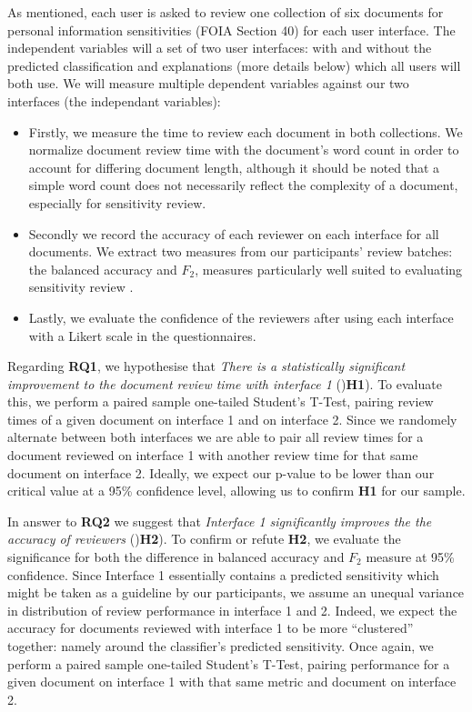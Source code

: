 \documentclass[\version]{l4proj}
\begin{document}
As mentioned, each user is asked to review one collection of six documents for personal information sensitivities (FOIA Section 40) for each user interface.
The independent variables will a set of two user interfaces: with and without the predicted classification and explanations (more details below) which all users will both use. We will measure multiple dependent variables against our two interfaces (the independant variables):

\begin{itemize}
    \item Firstly, we measure the time to review each document in both collections.
          We normalize document review time with the document's word count in order to account for differing document length, although it should be noted that a simple word count does not necessarily reflect the complexity of a document, especially for sensitivity review.
    \item Secondly we record the accuracy of each reviewer on each interface for all documents.
          We extract two measures from our participants' review batches: the balanced accuracy and \(F_{2}\), measures particularly well suited to evaluating sensitivity review \autocite{mcdonaldStudySVMKernel2017}.
    \item Lastly, we evaluate the confidence of the reviewers after using each interface with a Likert scale in the questionnaires.
\end{itemize}

Regarding \textbf{RQ1}, we hypothesise that \textit{There is a statistically significant improvement to the document review time with interface 1} ()\textbf{H1}).
To evaluate this, we perform a paired sample one-tailed Student's T-Test, pairing review times of a given document on interface 1 and on interface 2.
Since we randomely alternate between both interfaces we are able to pair all review times for a document reviewed on interface 1 with another review time for that same document on interface 2.
Ideally, we expect our p-value to be lower than our critical value at a 95\% confidence level, allowing us to confirm \textbf{H1} for our sample.

In answer to \textbf{RQ2} we suggest that \textit{Interface 1 significantly improves the the accuracy of reviewers} ()\textbf{H2}).
To confirm or refute \textbf{H2}, we evaluate the significance for both the difference in balanced accuracy and \(F_{2}\) measure at 95\% confidence.
Since Interface 1 essentially contains a predicted sensitivity which might be taken as a guideline by our participants, we assume an unequal variance in distribution of review performance in interface 1 and 2.
Indeed, we expect the accuracy for documents reviewed with interface 1 to be more ``clustered'' together: namely around the classifier's predicted sensitivity.
Once again, we perform a paired sample one-tailed Student's T-Test, pairing performance for a given document on interface 1 with that same metric and document on interface 2.
\end{document}
